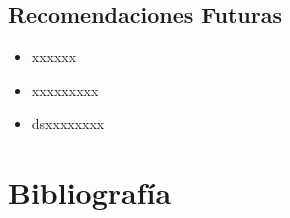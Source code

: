 \documentclass[12pt,a4paper,]{book}
\def\ifdoblecara{} %
\def\ifcitapandoc{} %
\let\ifcitapandoc\undefined %
\numberwithin{dummy}{section}
\theoremstyle{ocrenumbox}
\theoremstyle{ocrenumbox}
\theoremstyle{ocrenumbox}
\theoremstyle{ocrenumbox}
\theoremstyle{ocrenum}
\begin{document}
\hypertarget{recomendaciones-futuras}{%
\section{Recomendaciones Futuras}\label{recomendaciones-futuras}}

\begin{itemize}
\item
  xxxxxx
\item
  xxxxxxxxx
\item
  dsxxxxxxxx
\end{itemize}

\FloatBarrier

\FloatBarrier
\cleardoublepage

\ifdefined\ifdoblecara
  \fancyhead[LE,RO]{}
  \fancyfoot[LO,RE]{}
\else
  \fancyhead[RO]{}
  \fancyfoot[LO]{}
\fi

\ifdefined\ifcitapandoc

\hypertarget{bibliografuxeda}{%
\chapter*{Bibliografía}\label{bibliografuxeda}}

\else

\nocite{RStudio,R-knitr,R-rmarkdown,knitr2015,knitr2014,rmarkdown2018,
rmarkdown2020}

\fi




\end{document}
